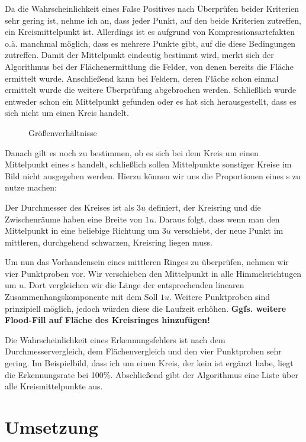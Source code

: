 Da die Wahrscheinlichkeit eines False Positives nach Überprüfen beider Kriterien sehr gering ist, nehme ich an, dass jeder Punkt, auf den beide Kriterien zutreffen, ein Kreismittelpunkt ist. Allerdings ist es aufgrund von Kompressionsartefakten o.ä. manchmal möglich, dass es mehrere Punkte gibt, auf die diese Bedingungen zutreffen. Damit der Mittelpunkt eindeutig bestimmt wird, merkt sich der Algorithmus bei der Flächenermittlung die Felder, von denen bereits die Fläche ermittelt wurde. Anschließend kann bei Feldern, deren Fläche schon einmal ermittelt wurde die weitere Überprüfung abgebrochen werden. Schließlich wurde entweder schon ein Mittelpunkt gefunden oder es hat sich herausgestellt, dass es sich nicht um einen Kreis handelt.

\begin{figure}
  \centering
  
  \caption{Größenverhältnisse}
  \label{abb:dims}
\end{figure}
Danach gilt es noch zu bestimmen, ob es sich bei dem Kreis um einen Mittelpunkt eines \task{}s handelt, schließlich sollen Mittelpunkte sonstiger Kreise im Bild nicht ausgegeben werden. Hierzu können wir uns die Proportionen eines \task{}s zu nutze machen:

Der Durchmesser des Kreises ist als \(3u\) definiert, der Kreisring und die Zwischenräume haben eine Breite von \(1u\). Daraus folgt, dass wenn man den Mittelpunkt in eine beliebige Richtung um \(3u\) verschiebt, der neue Punkt im mittleren, durchgehend schwarzen, Kreisring liegen muss.

Um nun das Vorhandensein eines mittleren Ringes zu überprüfen, nehmen wir vier Punktproben vor. Wir verschieben den Mittelpunkt in alle Himmelsrichtugen um \(u\). Dort vergleichen wir die Länge der entsprechenden linearen Zusammenhangskomponente mit dem Soll \(1u\). Weitere Punktproben sind prinzipiell möglich, jedoch würden diese die Laufzeit erhöhen. \textbf{Ggfs. weitere Flood-Fill auf Fläche des Kreisringes hinzufügen!}

Die Wahrscheinlichkeit eines Erkennungsfehlers ist nach dem Durchmesservergleich, dem Flächenvergleich und den vier Punktproben sehr gering. Im Beispielbild, dass ich um einen Kreis, der kein \task{} ist ergänzt habe, liegt die Erkennungsrate bei 100\%. Abschließend gibt der Algorithmus eine Liste über alle Kreismittelpunkte aus.

\pagebreak
\section{Umsetzung}

